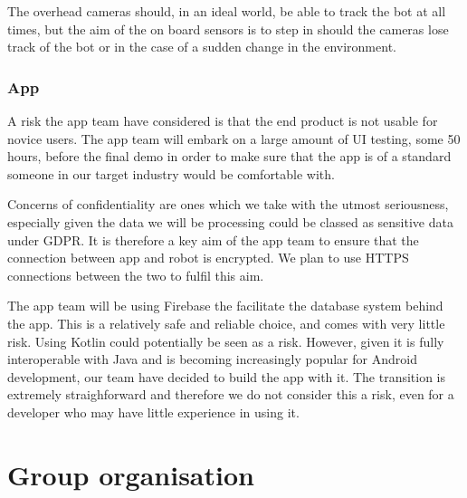 \documentclass{article}
\begin{document}
The overhead cameras should, in an ideal world, be able to track the bot at all times, but the aim of the on board sensors is to step in should the cameras lose track of the bot or in the case of a sudden change in the environment.

\subsubsection{App}

A risk the app team have considered is that the end product is not usable for novice users. The app team will embark on a large amount of UI testing, some 50 hours, before the final demo in order to make sure that the app is of a standard someone in our target industry would be comfortable with.

Concerns of confidentiality are ones which we take with the utmost seriousness, especially given the data we will be processing could be classed as sensitive data under GDPR. It is therefore a key aim of the app team to ensure that the connection between app and robot is encrypted. We plan to use HTTPS connections between the two to fulfil this aim.

The app team will be using Firebase the facilitate the database system behind the app. This is a relatively safe and reliable choice, and comes with very little risk. Using Kotlin could potentially be seen as a risk. However, given it is fully interoperable with Java and is becoming increasingly popular for Android development, our team have decided to build the app with it. The transition is extremely straighforward and therefore we do not consider this a risk, even for a developer who may have little experience in using it.

\section{Group organisation}
\begin{table}[]
  \caption{Team splits across the group. Names in bold are key points of contact.}
  \label{tab:group-split}
\end{table}
\end{document}
